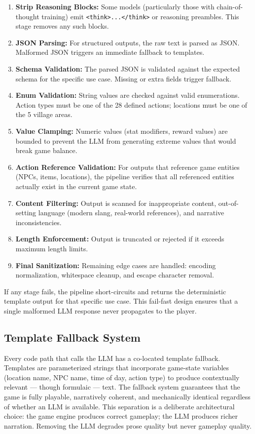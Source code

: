 \documentclass[12pt, a4paper, oneside]{report}
\begin{document}
\begin{enumerate}[nosep]
    \item \textbf{Strip Reasoning Blocks:} Some models (particularly those with chain-of-thought training) emit \texttt{<think>...</think>} or reasoning preambles. This stage removes any such blocks.
    \item \textbf{JSON Parsing:} For structured outputs, the raw text is parsed as JSON. Malformed JSON triggers an immediate fallback to templates.
    \item \textbf{Schema Validation:} The parsed JSON is validated against the expected schema for the specific use case. Missing or extra fields trigger fallback.
    \item \textbf{Enum Validation:} String values are checked against valid enumerations. Action types must be one of the 28 defined actions; locations must be one of the 5 village areas.
    \item \textbf{Value Clamping:} Numeric values (stat modifiers, reward values) are bounded to prevent the LLM from generating extreme values that would break game balance.
    \item \textbf{Action Reference Validation:} For outputs that reference game entities (NPCs, items, locations), the pipeline verifies that all referenced entities actually exist in the current game state.
    \item \textbf{Content Filtering:} Output is scanned for inappropriate content, out-of-setting language (modern slang, real-world references), and narrative inconsistencies.
    \item \textbf{Length Enforcement:} Output is truncated or rejected if it exceeds maximum length limits.
    \item \textbf{Final Sanitization:} Remaining edge cases are handled: encoding normalization, whitespace cleanup, and escape character removal.
\end{enumerate}

If any stage fails, the pipeline short-circuits and returns the deterministic template output for that specific use case. This fail-fast design ensures that a single malformed LLM response never propagates to the player.

\subsection{Template Fallback System}

Every code path that calls the LLM has a co-located template fallback. Templates are parameterized strings that incorporate game-state variables (location name, NPC name, time of day, action type) to produce contextually relevant --- though formulaic --- text. The fallback system guarantees that the game is fully playable, narratively coherent, and mechanically identical regardless of whether an LLM is available. This separation is a deliberate architectural choice: the game engine produces correct gameplay; the LLM produces richer narration. Removing the LLM degrades prose quality but never gameplay quality.
\end{document}
